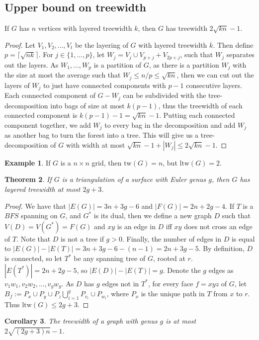 \documentclass[]{article}
\newcommand{\tw}{\text{tw}}
\newcommand{\ltw}{\text{ltw}}
\newtheorem{theorem}{Theorem}
\newtheorem{corollary}[theorem]{Corollary}
\theoremstyle{definition}
\newtheorem{example}[theorem]{Example}
\numberwithin{theorem}{section}
\numberwithin{equation}{section}
\begin{document}
\subsection{Upper bound on treewidth}
If $G$ has $n$ vertices with layered treewidth $k$, then $G$ has treewidth $2 \sqrt{kn} - 1$.
\begin{proof}
	Let $V_1, V_2, ..., V_t$ be the layering of $G$ with layered treewidth $k$. Then define $p = \lceil \sqrt{nk} \rceil$. For $j \in \lbrace 1, ..., p \rbrace$, let $W_j = V_j \cup V_{p + j} + V_{2p + j}$, such that $W_j$ separates out the layers. As $W_1, ..., W_p$ is a partition of $G$, as there is a partition $W_j$ with the size at most the average such that $W_j \leq n/p \leq \sqrt{kn}$, then we can cut out the layers of $W_j$ to just have connected components with $p-1$ consecutive layers. Each connected component of $G - W_j$ can be subdivided with the tree-decomposition into bags of size at most $k(p-1)$, thus the treewidth of each connected component is $k(p-1) - 1 = \sqrt{kn} - 1$. Putting each connected component together, we add $W_j$ to every bag in the decomposition and add $W_j$ as another bag to turn the forest into a tree. This will give us a tree-decomposition of $G$ with width at most $\sqrt{kn} - 1 + |W_j| \leq 2 \sqrt{kn} - 1$. 
\end{proof}

\begin{example}
	If $G$ is a $n \times n$ grid, then $\tw(G) = n$, but $\ltw(G) = 2$. 
\end{example}

\begin{theorem}
	If $G$ is a triangulation of a surface with Euler genus $g$, then $G$ has layered treewidth at most $2g + 3$. 
\end{theorem}

\begin{proof}
	We have that $|E(G)| = 3n + 3g - 6$ and $|F(G)| = 2n + 2g - 4$. If $T$ is a $BFS$ spanning on $G$, and $G^*$ is its dual, then we define a new graph $D$ such that $V(D) = V(G^*) = F(G)$ and $xy$ is an edge in $D$ iff $xy$ does not cross an edge of $T$. Note that $D$ is not a tree if $g > 0 $. Finally, the number of edges in $D$ is equal to $|E(G)| - |E(T)| = 3n + 3g - 6 - (n-1) = 2n + 3g - 5$. By definition, $D$ is connected, so let $T^*$ be any spanning tree of $G$, rooted at $r$. $|E(T^*)| = 2n + 2g - 5$, so $|E(D)| - |E(T)| = g$. Denote the $g$ edges as $v_1w_1, v_2w_2, ..., v_gw_g$. As $D$ has $g$ edges not in $T^*$, for every face $f = xyz$ of $G$, let $B_f := P_x \cup P_y \cup P_z \bigcup_{i = 1}^g P_{v_i} \cup P_{w_i}$, where $P_x$ is the unique path in $T$ from $x$ to $r$. Thus $\ltw(G) \leq 2g + 3$. 
\end{proof}
\begin{corollary}
	The treewidth of a graph with genus $g$ is at most $2\sqrt{(2g + 3) n } -1$. 
\end{corollary}
\end{document}
